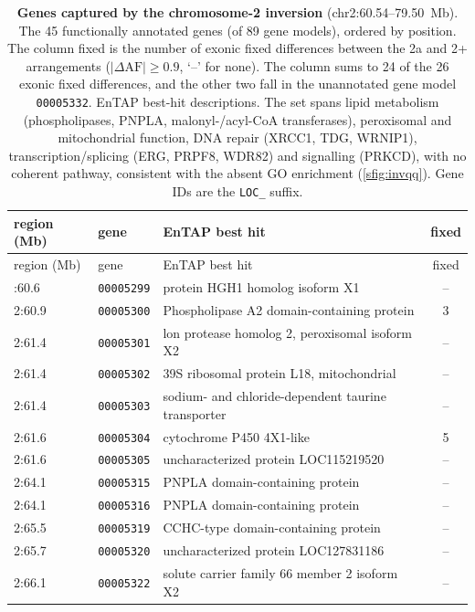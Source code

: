 \begingroup
\footnotesize
\begin{longtable}{llp{72mm}c}
  \caption{\textbf{Genes captured by the chromosome-2 inversion} (chr2:60.54--79.50~Mb).
    The 45 functionally annotated genes (of 89 gene models), ordered by position. The column fixed is the
    number of exonic fixed differences between the 2a and 2+ arrangements ($|\Delta\mathrm{AF}|\geq0.9$,
    `--' for none). The column sums to 24 of the 26 exonic fixed differences, and the other two fall in the unannotated gene model \texttt{00005332}. EnTAP best-hit descriptions. The set spans lipid metabolism (phospholipases, PNPLA,
    malonyl-/acyl-CoA transferases), peroxisomal and mitochondrial function, DNA repair
    (XRCC1, TDG, WRNIP1), transcription/splicing (ERG, PRPF8, WDR82) and signalling (PRKCD), with no
    coherent pathway, consistent with the absent GO enrichment (\cref{sfig:invqq}). Gene IDs are the
    \texttt{LOC\_} suffix.}\label{stab:invgenes}\\
  \toprule
  region (Mb) & gene & EnTAP best hit & fixed \\
  \midrule
  \endfirsthead
  \toprule region (Mb) & gene & EnTAP best hit & fixed \\ \midrule \endhead
  \bottomrule \endfoot
    2:60.6 & \texttt{00005299} & protein HGH1 homolog isoform X1 & -- \\
    2:60.9 & \texttt{00005300} & Phospholipase A2 domain-containing protein & 3 \\
    2:61.4 & \texttt{00005301} & lon protease homolog 2, peroxisomal isoform X2 & -- \\
    2:61.4 & \texttt{00005302} & 39S ribosomal protein L18, mitochondrial & -- \\
    2:61.4 & \texttt{00005303} & sodium- and chloride-dependent taurine transporter & -- \\
    2:61.6 & \texttt{00005304} & cytochrome P450 4X1-like & 5 \\
    2:61.6 & \texttt{00005305} & uncharacterized protein LOC115219520 & -- \\
    2:64.1 & \texttt{00005315} & PNPLA domain-containing protein & -- \\
    2:64.1 & \texttt{00005316} & PNPLA domain-containing protein & -- \\
    2:65.5 & \texttt{00005319} & CCHC-type domain-containing protein & -- \\
    2:65.7 & \texttt{00005320} & uncharacterized protein LOC127831186 & -- \\
    2:66.1 & \texttt{00005322} & solute carrier family 66 member 2 isoform X2 & -- \\

\end{longtable}
